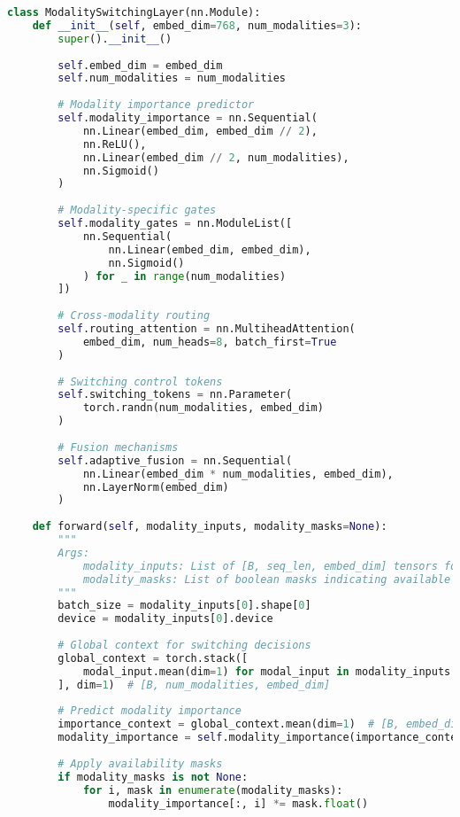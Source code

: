 \begin{lstlisting}[language=Python, caption=Dynamic modality switching architecture]
class ModalitySwitchingLayer(nn.Module):
    def __init__(self, embed_dim=768, num_modalities=3):
        super().__init__()
        
        self.embed_dim = embed_dim
        self.num_modalities = num_modalities
        
        # Modality importance predictor
        self.modality_importance = nn.Sequential(
            nn.Linear(embed_dim, embed_dim // 2),
            nn.ReLU(),
            nn.Linear(embed_dim // 2, num_modalities),
            nn.Sigmoid()
        )
        
        # Modality-specific gates
        self.modality_gates = nn.ModuleList([
            nn.Sequential(
                nn.Linear(embed_dim, embed_dim),
                nn.Sigmoid()
            ) for _ in range(num_modalities)
        ])
        
        # Cross-modality routing
        self.routing_attention = nn.MultiheadAttention(
            embed_dim, num_heads=8, batch_first=True
        )
        
        # Switching control tokens
        self.switching_tokens = nn.Parameter(
            torch.randn(num_modalities, embed_dim)
        )
        
        # Fusion mechanisms
        self.adaptive_fusion = nn.Sequential(
            nn.Linear(embed_dim * num_modalities, embed_dim),
            nn.LayerNorm(embed_dim)
        )
        
    def forward(self, modality_inputs, modality_masks=None):
        """
        Args:
            modality_inputs: List of [B, seq_len, embed_dim] tensors for each modality
            modality_masks: List of boolean masks indicating available modalities
        """
        batch_size = modality_inputs[0].shape[0]
        device = modality_inputs[0].device
        
        # Global context for switching decisions
        global_context = torch.stack([
            modal_input.mean(dim=1) for modal_input in modality_inputs
        ], dim=1)  # [B, num_modalities, embed_dim]
        
        # Predict modality importance
        importance_context = global_context.mean(dim=1)  # [B, embed_dim]
        modality_importance = self.modality_importance(importance_context)  # [B, num_modalities]
        
        # Apply availability masks
        if modality_masks is not None:
            for i, mask in enumerate(modality_masks):
                modality_importance[:, i] *= mask.float()
        

\end{lstlisting}
